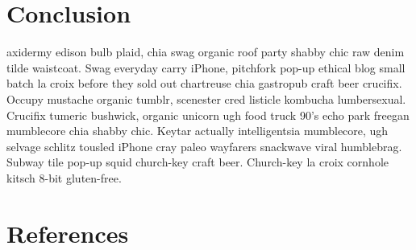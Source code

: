 \documentclass[a4paper]{article}
\newcommand*{\0}{$\ket{0}$}
\newcommand*{\1}{$\ket{1}$}
\begin{document}
\section{Conclusion}
\label{sec:conclusion}
axidermy edison bulb plaid, chia swag organic roof party shabby chic raw denim tilde waistcoat. Swag everyday carry iPhone, pitchfork pop-up ethical blog small batch la croix before they sold out chartreuse chia gastropub craft beer crucifix. Occupy mustache organic tumblr, scenester cred listicle kombucha lumbersexual. Crucifix tumeric bushwick, organic unicorn ugh food truck 90's echo park freegan mumblecore chia shabby chic. Keytar actually intelligentsia mumblecore, ugh selvage schlitz tousled iPhone cray paleo wayfarers snackwave viral humblebrag. Subway tile pop-up squid church-key craft beer. Church-key la croix cornhole kitsch 8-bit gluten-free.

\newpage
\section{References}
\begingroup
\renewcommand{\section}[2]{}%


\endgroup


\end{document}
